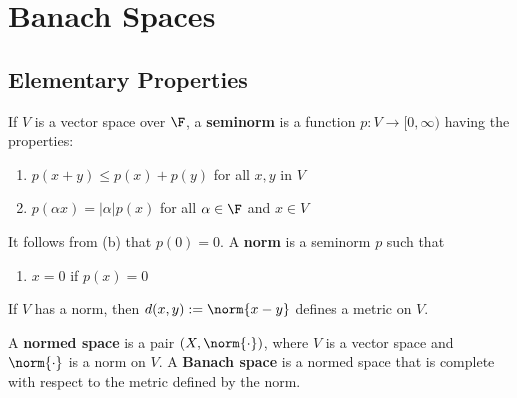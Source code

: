 %
%
%
\chapter{Banach Spaces}
\label{BanSpc} %




\section{Elementary Properties}
\label{sec:Ban}


\begin{defn}
    If $V$ is a vector space over $\F$, a \textbf{seminorm} is a function $p:V\rightarrow [0,\infty)$ having the properties: \begin{enumerate}
        \item[(a)] $p(x+y) \leq p(x)+p(y)$ for all $x,y$ in $V$
        \item[(b)] $p(\alpha x) = |\alpha|p(x)$ for all $\alpha \in \F$ and $x \in V$
    \end{enumerate}
    It follows from (b) that $p(0) = 0$. A \textbf{norm} is a seminorm $p$ such that \begin{enumerate}
        \item[(c)] $x = 0$ if $p(x) = 0$
    \end{enumerate}
\end{defn}

If $V$ has a norm, then $d(x,y) := \norm{x-y}$ defines a metric on $V$.

\begin{defn}
    A \textbf{normed space} is a pair $(X,\norm{\cdot})$, where $V$ is a vector space and $\norm{\cdot}$ is a norm on $V$. A \textbf{Banach space} is a normed space that is complete with respect to the metric defined by the norm.
\end{defn}

